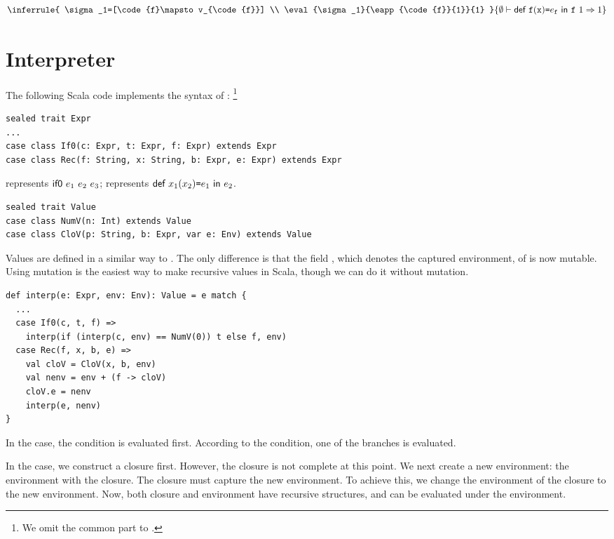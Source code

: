 \[
\inferrule
{
  \sigma_1=[\code{f}\mapsto v_{\code{f}}]
  \\
  \eval{\sigma_1}{\eapp{\code{f}}{1}}{1}
}
{ \evale{\erec{\code{f}}{\cx}{e_{\code{f}}}{\eapp{\code{f}}{1}}}{1} }
\]

\section{Interpreter}

The following Scala code implements the syntax of \Lang:
\footnote{We omit the common part to \plang.}

\begin{verbatim}
sealed trait Expr
...
case class If0(c: Expr, t: Expr, f: Expr) extends Expr
case class Rec(f: String, x: String, b: Expr, e: Expr) extends Expr
\end{verbatim}

 represents $\textsf{if0}\ e_1\ e_2\ e_3$;
 represents $\textsf{def}\ x_1(x_2)\texttt{=} e_1\ \textsf{in}\ e_2$.

\begin{verbatim}
sealed trait Value
case class NumV(n: Int) extends Value
case class CloV(p: String, b: Expr, var e: Env) extends Value
\end{verbatim}

Values are defined in a similar way to \plang. The only difference is that the
field , which denotes the captured environment, of  is now mutable.
Using mutation is the easiest way to make recursive values in Scala, though we
can do it without mutation.

\begin{verbatim}
def interp(e: Expr, env: Env): Value = e match {
  ...
  case If0(c, t, f) =>
    interp(if (interp(c, env) == NumV(0)) t else f, env)
  case Rec(f, x, b, e) =>
    val cloV = CloV(x, b, env)
    val nenv = env + (f -> cloV)
    cloV.e = nenv
    interp(e, nenv)
}
\end{verbatim}

In the  case, the condition is evaluated first. According to the
condition, one of the branches is evaluated.

In the  case, we
construct a closure first. However, the closure is not complete at this point.
We next create a new environment: the environment with the closure. The closure
must capture the new environment. To achieve this, we change the environment of
the closure to the new environment. Now, both closure and environment have
recursive structures, and  can be evaluated under the environment.

